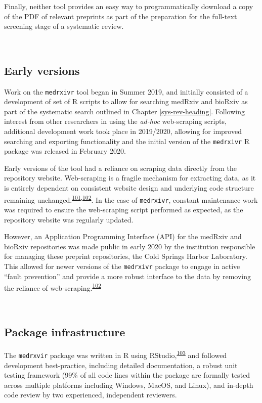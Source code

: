 \documentclass[a4paper, twoside]{templates/ociamthesis}
\begin{document}
Finally, neither tool provides an easy way to programmatically download a copy of the PDF of relevant preprints as part of the preparation for the full-text screening stage of a systematic review.

~

\hypertarget{early-versions}{%
\subsection{Early versions}\label{early-versions}}

Work on the \texttt{medrxivr} tool began in Summer 2019, and initially consisted of a development of set of R scripts to allow for searching medRxiv and bioRxiv as part of the systematic search outlined in Chapter \ref{sys-rev-heading}. Following interest from other researchers in using the \emph{ad-hoc} web-scraping scripts, additional development work took place in 2019/2020, allowing for improved searching and exporting functionality and the initial version of the \texttt{medrxivr} R package was released in February 2020.

Early versions of the tool had a reliance on scraping data directly from the repository website. Web-scraping is a fragile mechanism for extracting data, as it is entirely dependent on consistent website design and underlying code structure remaining unchanged.\textsuperscript{\protect\hyperlink{ref-shaw2002}{101},\protect\hyperlink{ref-laprie1992}{102}}. In the case of \texttt{medrxivr}, constant maintenance work was required to ensure the web-scraping script performed as expected, as the repository website was regularly updated.

However, an Application Programming Interface (API) for the medRxiv and bioRxiv repositories was made public in early 2020 by the institution responsible for managing these preprint repositories, the Cold Springs Harbor Laboratory. This allowed for newer versions of the \texttt{medrxivr} package to engage in active ``fault prevention'' and provide a more robust interface to the data by removing the reliance of web-scraping.\textsuperscript{\protect\hyperlink{ref-laprie1992}{102}}

~

\hypertarget{package-infrastructure}{%
\subsection{Package infrastructure}\label{package-infrastructure}}

The \texttt{medrxvir} package was written in R using RStudio,\textsuperscript{\protect\hyperlink{ref-rcoreteam2019}{103}} and followed development best-practice, including detailed documentation, a robust unit testing framework (99\% of all code lines within the package are formally tested across multiple platforms including Windows, MacOS, and Linux), and in-depth code review by two experienced, independent reviewers.
\end{document}
